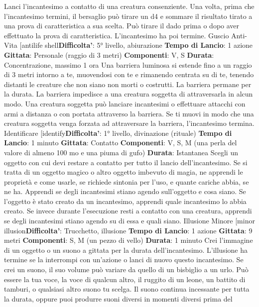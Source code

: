 \begin{multicols}{2}
Lanci l’incantesimo a contatto di una creatura
consenziente. Una volta, prima che l’incantesimo
termini, il bersaglio può tirare un d4 e sommare il
risultato tirato a una prova di caratteristica a sua scelta.
Può tirare il dado prima o dopo aver effettuato la prova
di caratteristica. L’incantesimo ha poi termine.
Guscio Anti-Vita
[antilife shell\textbf{Difficolta'}:
5° livello, abiurazione
\textbf{Tempo di Lancio}: 1 azione
\textbf{Gittata}: Personale (raggio di 3 metri)
\textbf{Componenti}: V, S
\textbf{Durata}: Concentrazione, massimo 1 ora
Una barriera luminosa si estende fino a un raggio di 3
metri intorno a te, muovendosi con te e rimanendo
centrata su di te, tenendo distanti le creature che non
siano non morti o costrutti. La barriera permane per la
durata.
La barriera impedisce a una creatura soggetta di
attraversarla in alcun modo. Una creatura soggetta può
lanciare incantesimi o effettuare attacchi con armi a
distanza o con portata attraverso la barriera.
Se ti muovi in modo che una creatura soggetta venga
forzata ad attraversare la barriera, l’incantesimo
termina.
Identificare
[identify\textbf{Difficolta'}:
1° livello, divinazione (rituale)
\textbf{Tempo di Lancio}: 1 minuto
\textbf{Gittata}: Contatto
\textbf{Componenti}: V, S, M (una perla del valore di almeno
100 mo e una piuma di gufo)
\textbf{Durata}: Istantanea
Scegli un oggetto con cui devi restare a contatto per
tutto il lancio dell’incantesimo. Se si tratta di un oggetto
magico o altro oggetto imbevuto di magia, ne apprendi
le proprietà e come usarle, se richiede sintonia per
l’uso, e quante cariche abbia, se ne ha. Apprendi se
degli incantesimi stiano agendo sull’oggetto e cosa
siano. Se l’oggetto è stato creato da un incantesimo,
apprendi quale incantesimo lo abbia creato.
Se invece durante l’esecuzione resti a contatto con una
creatura, apprendi se degli incantesimi stiano agendo
su di essa e quali siano.
Illusione Minore
[minor illusion\textbf{Difficolta'}:
Trucchetto, illusione
\textbf{Tempo di Lancio}: 1 azione
\textbf{Gittata}: 9 metri
\textbf{Componenti}: S, M (un pezzo di vello)
\textbf{Durata}: 1 minuto
Crei l’immagine di un oggetto o un suono a gittata per la
durata dell’incantesimo. L’illusione ha termine se la
interrompi con un’azione o lanci di nuovo questo
incantesimo.
Se crei un suono, il suo volume può variare da quello di
un bisbiglio a un urlo. Può essere la tua voce, la voce di
qualcun altro, il ruggito di un leone, un battito di
tamburi, o qualsiasi altro suono tu scelga. Il suono
continua incessante per tutta la durata, oppure puoi
produrre suoni diversi in momenti diversi prima del

\end{multicols}
